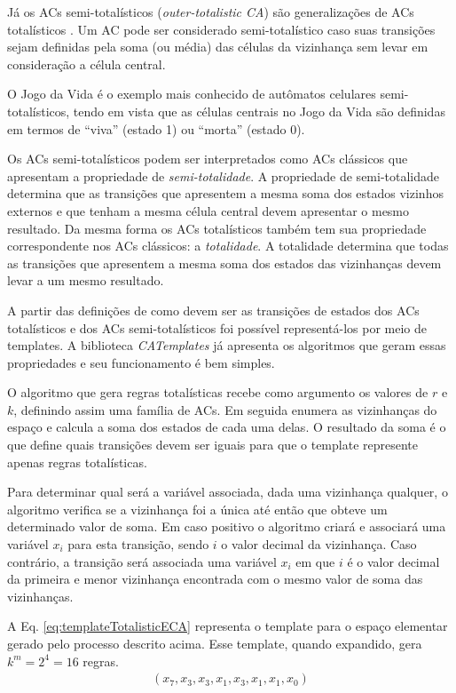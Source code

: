 Já os ACs semi-totalísticos (\textit{outer-totalistic CA}) são generalizações de ACs totalísticos \cite{weisstein2015outerTotalistic}. Um AC pode ser considerado semi-totalístico caso suas transições sejam definidas pela soma (ou média) das células da vizinhança sem levar em consideração a célula central.

O Jogo da Vida \cite{GardnerM1970} é o exemplo mais conhecido de autômatos celulares semi-totalísticos, tendo em vista que as células centrais no Jogo da Vida são definidas em termos de ``viva'' (estado 1) ou ``morta'' (estado 0).

Os ACs semi-totalísticos podem ser interpretados como ACs clássicos que apresentam a propriedade de \textit{semi-totalidade}. A propriedade de semi-totalidade determina que as transições que apresentem a mesma soma dos estados vizinhos externos e que tenham a mesma célula central devem apresentar o mesmo resultado. Da mesma forma os ACs totalísticos também tem sua propriedade correspondente nos ACs clássicos: a \textit{totalidade}. A totalidade determina que todas as transições que apresentem a mesma soma dos estados das vizinhanças devem levar a um mesmo resultado.

A partir das definições de como devem ser as transições de estados dos ACs totalísticos e dos ACs semi-totalísticos foi possível representá-los por meio de templates. A biblioteca \textit{CATemplates} já apresenta os algoritmos que geram essas propriedades e seu funcionamento é bem simples. 

O algoritmo que gera regras totalísticas recebe como argumento os valores de $r$ e $k$, definindo assim uma família de ACs. Em seguida enumera as vizinhanças do espaço e calcula a soma dos estados de cada uma delas. O resultado da soma é o que define quais transições devem ser iguais para que o template represente apenas regras totalísticas.

Para determinar qual será a variável associada, dada uma vizinhança qualquer, o algoritmo verifica se a vizinhança foi a única até então que obteve um determinado valor de soma. Em caso positivo o algoritmo criará e associará uma variável $x_i$ para esta transição, sendo $i$ o valor decimal da vizinhança. Caso contrário, a transição será associada uma variável $x_i$ em que $i$ é o valor decimal da primeira e menor vizinhança encontrada com o mesmo valor de soma das vizinhanças.

A Eq. \eqref{eq:templateTotalisticECA} representa o template para o espaço elementar gerado pelo processo descrito acima. Esse template, quando expandido, gera $k^m = 2^4 = 16$ regras.
\begin{equation}
\begin{split}
(x_7,x_3,x_3,x_1,x_3,x_1,x_1,x_0)
\label{eq:templateTotalisticECA}
\end{split}
\end{equation}

